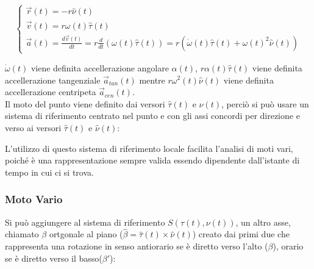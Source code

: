 \documentclass{article}
\numberwithin{equation}{subsection}
\begin{document}
\begin{equation}
    \begin{cases}
        \vec{r}(t)=-r\hat{\nu}(t)\\
        \vec{v}(t)=r\omega(t)\hat{\tau}(t)\\
        \vec{a}(t)=\displaystyle\frac{d\vec{v}(t)}{dt}
        =r\frac{d}{dt}(\omega(t)\hat{\tau}(t))
        =r(\dot\omega(t)\hat{\tau}(t)+\omega(t)^{2}\hat{\nu}(t))
    \end{cases}
\end{equation}

$\dot\omega(t)$ viene definita accellerazione angolare $\alpha(t)$, 
$r\alpha(t)\hat{\tau}(t)$ viene definita accellerazione tangenziale 
$\vec{a}_{tan}(t)$ mentre $r\omega^{2}(t)\hat{\nu}(t)$ viene definita 
accellerazione centripeta $\vec{a}_{cen}(t)$.\\
Il moto del punto viene definito dai versori $\hat{\tau}(t)$ e $\hat{\nu}(t)$, 
perciò si può usare un sistema di riferimento centrato nel punto e con gli assi 
concordi per direzione e verso ai versori $\hat{\tau}(t)$ e $\hat{\nu}(t)$:

\begin{center}\end{center}

L'utilizzo di questo sistema di riferimento locale facilita 
l'analisi di moti vari, poiché è una rappresentazione sempre 
valida essendo dipendente dall'istante di tempo in cui ci 
si trova.

\subsubsection{Moto Vario}
Si può aggiungere al sistema di riferimento $S(\tau(t), \nu(t))$, un altro 
asse, chiamato $\beta$ ortgonale al piano ($\hat{\beta}=\hat{\tau}(t)\times\hat{\nu}(t)$) creato dai primi due 
che rappresenta una rotazione in senso antiorario se è diretto 
verso l'alto ($\beta$), orario se è diretto verso il basso($\beta'$):
\end{document}
